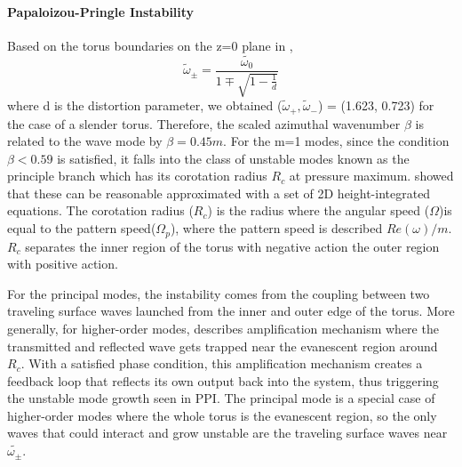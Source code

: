 \documentclass[iop,revtex4]{emulateapj}
\begin{document}
\paragraph*{\rm{\textbf{Papaloizou-Pringle Instability}\\}}
\par Based on the torus boundaries on the z=0 plane in \citep{Papaloizou:1984A},
\begin{equation}
\tilde{\omega}_\pm  = \frac{\tilde{\omega_0}}{1\mp\sqrt{1-\frac{1}{d}}}
\label{boundary}
\end{equation}
where d is the distortion parameter, we obtained ($\tilde{\omega}_+,\tilde{\omega}_-$) = (1.623, 0.723) for the case of a slender torus. Therefore, the scaled azimuthal wavenumber $\beta$ is related to the wave mode by $\beta = 0.45 m $.  For the m=1 modes, since the condition $\beta<0.59$ is satisfied, it falls into the class of unstable modes known as the principle branch which has its corotation radius $R_c$ at pressure maximum. \cite{Goldreich:1986A} showed that these can be reasonable approximated with a set of 2D height-integrated equations. The corotation radius ($R_c$) is the radius where the angular speed ($\Omega$)is equal to the pattern speed($\Omega_p$), where the pattern speed is described $Re(\omega)/m$. $R_c$ separates the inner region of the torus with negative action the outer region with positive action.
\par For the principal modes, the instability comes from the coupling between two traveling surface waves launched from the inner and outer edge of the torus. More generally, for higher-order modes, \cite{Narayan:1987A} describes amplification mechanism where the transmitted and reflected wave gets trapped near the evanescent region around $R_c$. With a satisfied phase condition, this amplification mechanism creates a feedback loop that reflects its own output back into the system, thus triggering the unstable mode growth seen in \ac{PPI}. The principal mode is a special case of higher-order modes where the whole torus is the evanescent region, so the only waves that could interact and grow unstable are the traveling surface waves near $\tilde{\omega_\pm}$.
\end{document}
